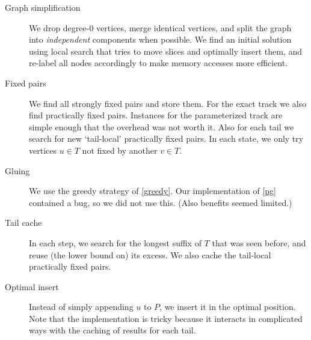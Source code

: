 \documentclass[a4paper,UKenglish,cleveref, autoref, thm-restate]{lipics-v2021}
\begin{document}
\begin{description}
  \item[Graph simplification] We drop degree-$0$ vertices, merge identical
    vertices, and split the graph into \emph{independent} components when
    possible. We find an initial solution using local search that tries to move
    slices and optimally insert them, and re-label all nodes accordingly to make
    memory accesses more efficient.
  \item[Fixed pairs] We find all strongly fixed pairs and store them. For the
    exact track we also find practically fixed pairs. Instances for the parameterized
    track are simple enough that the overhead was not worth it. Also for each
    tail we search for new `tail-local' practically fixed pairs. In each state, we only
    try vertices $u\in T$ not fixed by another $v\in T$.
  \item[Gluing] We use the greedy strategy of \cref{greedy}. Our implementation
    of \cref{pg} contained a bug, so we did not use this. (Also benefits
    seemed limited.)
  \item[Tail cache] In each step, we search for the longest suffix of $T$ that
    was seen before, and reuse (the lower bound on) its excess. We also
    cache the tail-local practically fixed pairs.
  \item[Optimal insert] Instead of simply appending $u$ to $P$, we
    insert it in the optimal position. Note that the
    implementation is tricky because it interacts in complicated ways with
    the caching of results for each tail.
\end{description}
\end{document}
